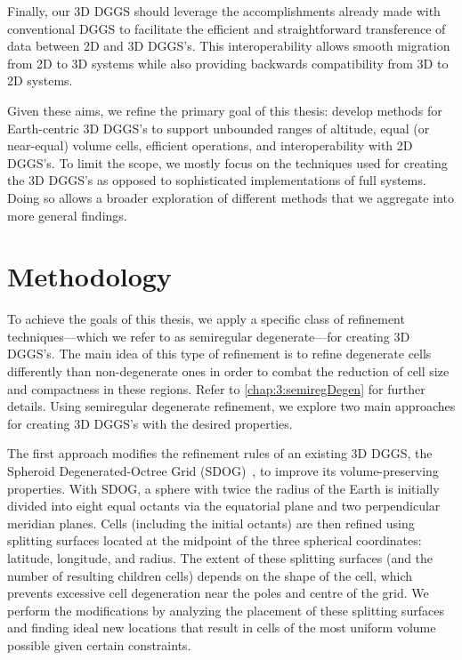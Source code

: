 Finally, our 3D DGGS should leverage the accomplishments already made with conventional DGGS to facilitate the efficient and straightforward transference of data between 2D and 3D DGGS's. This interoperability allows smooth migration from 2D to 3D systems while also providing backwards compatibility from 3D to 2D systems.


Given these aims, we refine the primary goal of this thesis: develop methods for Earth-centric 3D DGGS's to support unbounded ranges of altitude, equal (or near-equal) volume cells, efficient operations, and interoperability with 2D DGGS's.
To limit the scope, we mostly focus on the techniques used for creating the 3D DGGS's as opposed to sophisticated implementations of full systems.
Doing so allows a broader exploration of different methods that we aggregate into more general findings.


\section{Methodology} \label{chap:1:method}
To achieve the goals of this thesis, we apply a specific class of refinement techniques---which we refer to as semiregular degenerate---for creating 3D DGGS's.
The main idea of this type of refinement is to refine degenerate cells differently than non-degenerate ones in order to combat the reduction of cell size and compactness in these regions.
Refer to \cref{chap:3:semiregDegen} for further details.
Using semiregular degenerate refinement, we explore two main approaches for creating 3D DGGS's with the desired properties.


The first approach modifies the refinement rules of an existing 3D DGGS, the Spheroid Degenerated-Octree Grid (SDOG)~\cite{yu2009sdog}, to improve its volume-preserving properties.
With SDOG, a sphere with twice the radius of the Earth is initially divided into eight equal octants via the equatorial plane and two perpendicular meridian planes.
Cells (including the initial octants) are then refined using splitting surfaces located at the midpoint of the three spherical coordinates: latitude, longitude, and radius.
The extent of these splitting surfaces (and the number of resulting children cells) depends on the shape of the cell, which prevents excessive cell degeneration near the poles and centre of the grid.
We perform the modifications by analyzing the placement of these splitting surfaces and finding ideal new locations that result in cells of the most uniform volume possible given certain constraints.


